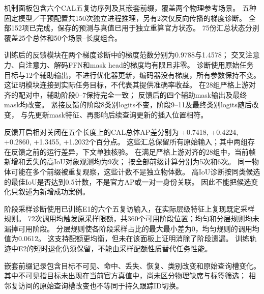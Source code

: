 机制面板包含六个CAL五复访序列及其嵌套前缀，覆盖两个物理参考场景。
五种固定模型／干预配置共150次独立进程推理，另有2次仅反向传播的梯度诊断。
全部152项已完成，保存的预测与真值已用于独立重算官方状态。
75份汇总状态分别覆盖25个总体和50个场景--长度组合。

训练后的反馈模块在两个梯度诊断中的梯度范数分别为0.9788与1.4578；
交叉注意力、自注意力、解码FFN和mask head的梯度均有限且非零。
诊断使用原始任务目标与12个辅助输出，不进行优化器更新，编码器没有梯度，所有参数保持不变。
这证明模块连接到实际任务目标，不代表其提供准确率收益。
在28组严格上游对齐的配对中，辅助阶段0--7保持完全一致；
反馈后的四个辅助mask输出及最终mask均改变。
紧接反馈的阶段8类别logits不变，阶段9--11及最终类别logits随后改变，
与先更新mask特征、再影响后续查询更新的插入位置相符。

反馈开启相对关闭在五个长度上的CAL总体AP差分别为
+0.7418, +0.4224, +0.2860, +1.3455, +1.2032个百分点。
这些汇总保留所有原始输入；其中两组存在反馈之前的运行差异，下文单独核验。
在满足严格上游对齐的28组中，当前帧新增和丢失的高IoU对象观测均为9次；
按全部前缀计算分别为5次和6次。
同一物体可能在多个前缀被重复观察，这些计数不是独立物体数。
高IoU诊断按同类候选的最佳IoU是否达到0.5计数，不是官方AP或一对一身份关联。
因此不能把候选变化只叙述为新增成功案例。

阶段采样诊断使用已训练E1的六个五复访输入，在实际层级特征上复现既定采样规则。
72次调用均触发原采样限额，共360个可用阶段位置；均匀和分层规则均未漏掉可用阶段。
分层规则使各阶段采样占比的最大最小差为0，均匀规则的调用均值为0.0612。
这支持配额更均衡，但未在该面板上证明消除了阶段遗漏。
训练轨迹中E2的短时退化仍须保留，不能由采样配额性质替代任务性能。

嵌套前缀记录包含目标不可见、命中、丢失、恢复、类别改变和原始查询槽变化。
其中不可见指目标未出现在当前官方真值中，尚未区分物理缺席与标签筛选；
相邻复访间的原始查询槽改变也不等同于持久跟踪ID切换。
